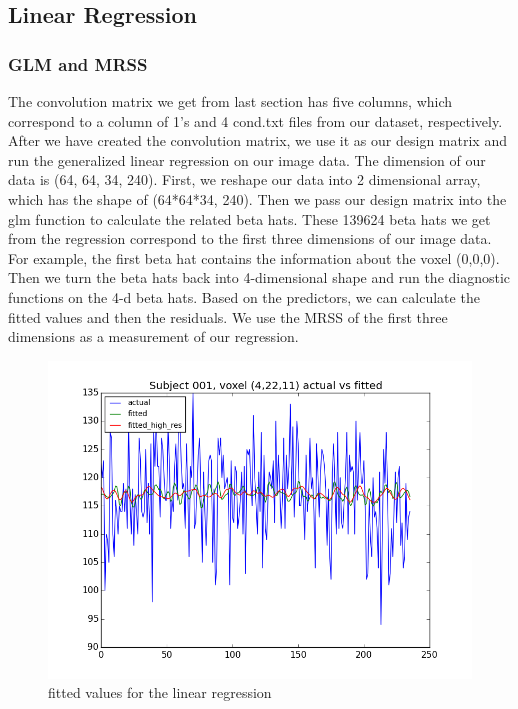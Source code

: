 \subsection{Linear Regression}
\subsubsection{GLM and MRSS}
\noindent
The convolution matrix we get from last section has five columns, which correspond to a column of 1's and 4 cond.txt files from our dataset, respectively. After we have created the convolution matrix, we use it as our design matrix and run the generalized linear regression on our image data. The dimension of our data is (64, 64, 34, 240). First, we reshape our data into 2 dimensional array, which has the shape of (64*64*34, 240). Then we pass our design matrix into the glm function to calculate the related beta hats. These 139624 beta hats we get from the regression correspond to the first three dimensions of our image data. For example, the first beta hat contains the information about the voxel (0,0,0). Then we turn the beta hats back into 4-dimensional shape and run the diagnostic functions on the 4-d beta hats. Based on the predictors, we can calculate the fitted values and then the residuals. We use the MRSS of the first three dimensions as a measurement of our regression. \newline

\begin{figure}[H]
    \centering
        \includegraphics[scale=0.5]{../../plots/glm_fitted.png}
    \caption{fitted values for the linear regression}
\end{figure}


